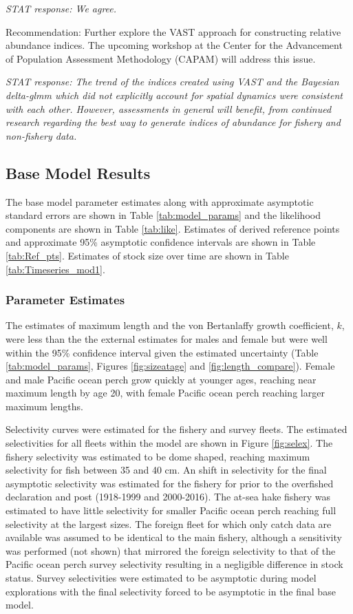 \documentclass[12pt,]{article}
\begin{document}
\emph{STAT response: We agree.}

Recommendation: Further explore the VAST approach for constructing
relative abundance indices. The upcoming workshop at the Center for the
Advancement of Population Assessment Methodology (CAPAM) will address
this issue.

\emph{STAT response: The trend of the indices created using VAST and the
Bayesian delta-glmm which did not explicitly account for spatial
dynamics were consistent with each other. However, assessments in
general will benefit, from continued research regarding the best way to
generate indices of abundance for fishery and non-fishery data.}

\subsection{Base Model Results}\label{base-model-results}

The base model parameter estimates along with approximate asymptotic
standard errors are shown in Table \ref{tab:model_params} and the
likelihood components are shown in Table \ref{tab:like}. Estimates of
derived reference points and approximate 95\% asymptotic confidence
intervals are shown in Table \ref{tab:Ref_pts}. Estimates of stock size
over time are shown in Table \ref{tab:Timeseries_mod1}.

\subsubsection{Parameter Estimates}\label{parameter-estimates}

The estimates of maximum length and the von Bertanlaffy growth
coefficient, \(k\), were less than the the external estimates for males
and female but were well within the 95\% confidence interval given the
estimated uncertainty (Table \ref{tab:model_params}, Figures
\ref{fig:sizeatage} and \ref{fig:length_compare}). Female and male
Pacific ocean perch grow quickly at younger ages, reaching near maximum
length by age 20, with female Pacific ocean perch reaching larger
maximum lengths.

Selectivity curves were estimated for the fishery and survey fleets. The
estimated selectivities for all fleets within the model are shown in
Figure \ref{fig:selex}. The fishery selectivity was estimated to be dome
shaped, reaching maximum selectivity for fish between 35 and 40 cm. An
shift in selectivity for the final asymptotic selectivity was estimated
for the fishery for prior to the overfished declaration and post
(1918-1999 and 2000-2016). The at-sea hake fishery was estimated to have
little selectivity for smaller Pacific ocean perch reaching full
selectivity at the largest sizes. The foreign fleet for which only catch
data are available was assumed to be identical to the main fishery,
although a sensitivity was performed (not shown) that mirrored the
foreign selectivity to that of the Pacific ocean perch survey
selectivity resulting in a negligible difference in stock status. Survey
selectivities were estimated to be asymptotic during model explorations
with the final selectivity forced to be asymptotic in the final base
model.
\end{document}
